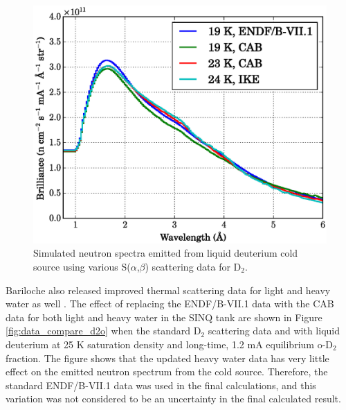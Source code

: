 \documentclass[5p,12pt]{elsarticle}
\begin{document}
\begin{figure}[h!] 
  \centering
    \includegraphics[width=\columnwidth]{graphics/data_compare_d2.eps}
     \caption{Simulated neutron spectra emitted from liquid deuterium cold source using various S($\alpha$,$\beta$) scattering data for D$_2$. \label{fig:data_compare_d2}}
\end{figure}  

Bariloche also released improved thermal scattering data for light and heavy water as well \cite{granada_d2o_1,granada_d2o_2,granada_d2o_3}.  The effect of replacing the ENDF/B-VII.1 data with the CAB data for both light and heavy water in the SINQ tank are shown in Figure \ref{fig:data_compare_d2o} when the standard D$_2$ scattering data and with liquid deuterium at 25 K  saturation density and long-time, 1.2 mA equilibrium o-D$_2$ fraction.  The figure shows that the updated heavy water data has very little effect on the emitted neutron spectrum from the cold source.  Therefore, the standard ENDF/B-VII.1 data was used in the final calculations, and this variation was not considered to be an uncertainty in the final calculated result.
\end{document}
